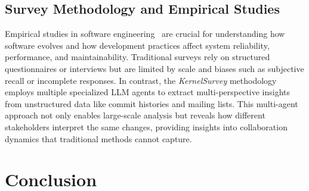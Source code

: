 \documentclass[sigconf,review,anonymous]{acmart}
\newcommand{\sys}{\textit{KernelSurvey}\xspace}
\begin{document}
\subsection{Survey Methodology and Empirical Studies}

Empirical studies in software engineering~\cite{perry2000empirical} are crucial for understanding how software evolves and how development practices affect system reliability, performance, and maintainability. Traditional surveys rely on structured questionnaires or interviews but are limited by scale and biases such as subjective recall or incomplete responses. In contrast, the \sys methodology employs multiple specialized LLM agents to extract multi-perspective insights from unstructured data like commit histories and mailing lists. This multi-agent approach not only enables large-scale analysis but reveals how different stakeholders interpret the same changes, providing insights into collaboration dynamics that traditional methods cannot capture.






\section{Conclusion}
\end{document}
